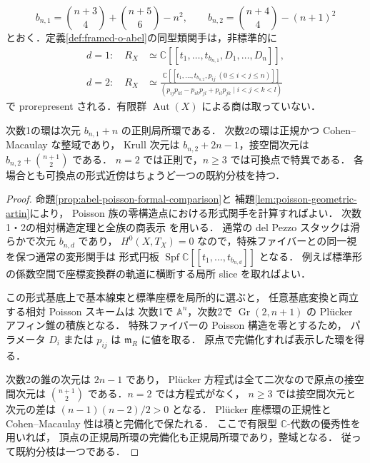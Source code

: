 \begin{theorem}
\label{thm:abel-formal-ring}
\[
 b_{n,1}=\binom{n+3}{4}+\binom{n+5}{6}-n^2,
 \qquad
 b_{n,2}=\binom{n+4}{4}-(n+1)^2
\]
とおく．定義\ref{def:framed-o-abel}の同型類関手は，非標準的に
\begin{align*}
 d=1:\quad R_X&\simeq
 \mathbb C[[t_1,\ldots,t_{b_{n,1}},D_1,\ldots,D_n]],\\
 d=2:\quad R_X&\simeq
 \frac{\mathbb C[[t_1,\ldots,t_{b_{n,2}},p_{ij}\ (0\leq i<j\leq n)]]}
 {(p_{ij}p_{kl}-p_{ik}p_{jl}+p_{il}p_{jk}\mid i<j<k<l)}
\end{align*}
で prorepresent される．有限群 $\operatorname{Aut}(X)$ による商は取っていない．

次数1の環は次元 $b_{n,1}+n$ の正則局所環である．
次数2の環は正規かつ Cohen--Macaulay な整域であり，
Krull 次元は $b_{n,2}+2n-1$，接空間次元は
$b_{n,2}+\binom{n+1}{2}$ である．
$n=2$ では正則で，$n\geq3$ では可換点で特異である．
各場合とも可換点の形式近傍はちょうど一つの既約分枝を持つ．
\end{theorem}
\begin{proof}
命題\ref{prop:abel-poisson-formal-comparison}と
補題\ref{lem:poisson-geometric-artin}により，
Poisson 族の零構造点における形式関手を計算すればよい．
次数1・2の相対構造定理と全族の商表示
\cite[定理7.3，定理8.8]{PoissonDP}を用いる．
通常の del Pezzo スタックは滑らかで次元 $b_{n,d}$ であり，
$H^0(X,T_X)=0$ なので，特殊ファイバーとの同一視を保つ通常の変形関手は
形式円板 $\operatorname{Spf}\mathbb C[[t_1,\ldots,t_{b_{n,d}}]]$ となる．
例えば標準形の係数空間で座標変換群の軌道に横断する局所 slice を取ればよい．

この形式基底上で基本線束と標準座標を局所的に選ぶと，
任意基底変換と両立する相対 Poisson スキームは
次数1で $\mathbb A^n$，次数2で $\operatorname{Gr}(2,n+1)$ の
Pl\"ucker アフィン錐の積族となる．
特殊ファイバーの Poisson 構造を零とするため，
パラメータ $D_i$ または $p_{ij}$ は $\mathfrak m_R$ に値を取る．
原点で完備化すれば表示した環を得る．

次数2の錐の次元は $2n-1$ であり，
Pl\"ucker 方程式は全て二次なので原点の接空間次元は
$\binom{n+1}{2}$ である．$n=2$ では方程式がなく，
$n\geq3$ では接空間次元と次元の差は
$(n-1)(n-2)/2>0$ となる．
Pl\"ucker 座標環の正規性と Cohen--Macaulay 性\cite{Svanes1973,DeConciniProcesi1981}は積と完備化で保たれる．
ここで有限型 $\mathbb C$-代数の優秀性を用いれば，
頂点の正規局所環の完備化も正規局所環であり，整域となる．
従って既約分枝は一つである．
\end{proof}

